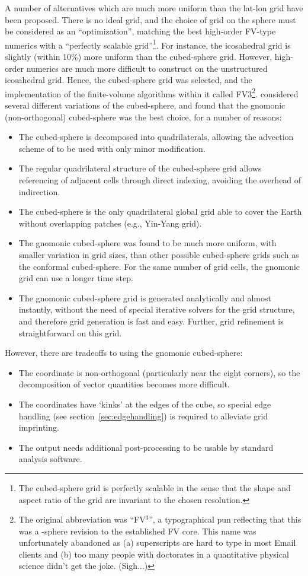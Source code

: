 \documentclass[10pt,letterpaper,margin=1in]{memoir}
\begin{document}
A number of alternatives which are much more uniform than the lat-lon grid have been proposed. There is no ideal grid, and the choice of grid on the sphere must be considered as an ``optimization'', matching the best high-order FV-type numerics with a ``perfectly scalable grid''\footnote{The cubed-sphere grid is perfectly scalable in the sense that the shape and aspect ratio of the grid are invariant to the chosen resolution.}. For instance, the icosahedral grid is slightly (within 10\%) more uniform than the cubed-sphere grid. However, high-order numerics are much more difficult to construct on the unstructured icosahedral grid. Hence, the cubed-sphere grid was selected, and the implementation of the finite-volume algorithms within it called FV3\footnote{The original abbreviation was ``FV$^3$'', a typographical pun reflecting that this was a -sphere revision to the established FV core. This name was unfortunately abandoned as (a) superscripts are hard to type in most Email clients and (b) too many people with doctorates in a quantitative physical science didn't get the joke. (Sigh...)}. \citet{PL07} considered several different variations of the cubed-sphere, and found that the gnomonic (non-orthogonal) cubed-sphere was the best choice, for a number of reasons:
\begin{itemize}
\item The cubed-sphere is decomposed into quadrilaterals, allowing the advection scheme of \citet{LR96} to be used with only minor modification.
\item The regular quadrilateral structure of the cubed-sphere grid allows referencing of adjacent cells through direct indexing, avoiding the overhead of indirection.
\item The cubed-sphere is the only quadrilateral global grid able to cover the Earth without overlapping patches (e.g., Yin-Yang grid).
\item The gnomonic cubed-sphere was found to be much more uniform, with smaller variation in grid sizes, than other possible cubed-sphere grids such as the conformal cubed-sphere. For the same number of grid cells, the gnomonic grid can use a longer time step. 
\item The gnomonic cubed-sphere grid is generated analytically and almost instantly, without the need of special iterative solvers for the grid structure, and therefore grid generation is fast and easy. Further, grid refinement is straightforward on this grid.
\end{itemize}
However, there are tradeoffs to using the gnomonic cubed-sphere:
\begin{itemize}
\item The coordinate is non-orthogonal (particularly near the eight corners), so the decomposition of vector quantities becomes more difficult.
\item The coordinates have `kinks' at the edges of the cube, so special edge handling (see section~\ref{sec:edgehandling}) is required to alleviate grid imprinting.
\item The output needs additional post-processing to be usable by standard analysis software.
\end{itemize}
\end{document}
